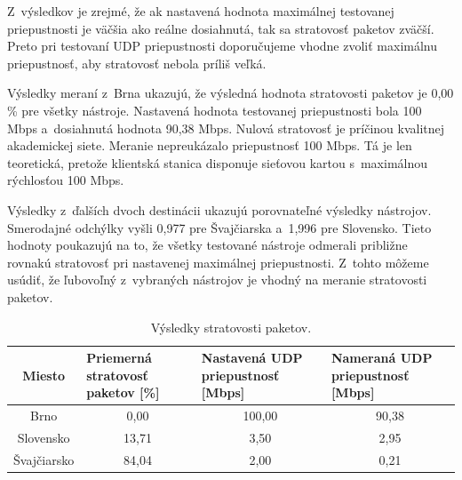         Z~výsledkov je zrejmé, že ak nastavená hodnota maximálnej testovanej 
        priepustnosti je väčšia ako reálne dosiahnutá, tak sa stratovosť paketov 
        zväčší. Preto pri testovaní UDP priepustnosti doporučujeme vhodne zvoliť
        maximálnu priepustnosť, aby stratovosť nebola príliš veľká.

        Výsledky meraní z~Brna ukazujú, že výsledná hodnota stratovosti
        paketov je 0,00 \% pre všetky nástroje. Nastavená hodnota testovanej
        priepustnosti bola 100 Mbps a~dosiahnutá hodnota 90,38 Mbps. Nulová
        stratovosť je príčinou kvalitnej akademickej siete. Meranie 
        nepreukázalo priepustnosť 100 Mbps. Tá je len teoretická, pretože 
        klientská stanica disponuje sieťovou kartou s~maximálnou rýchlosťou 100
        Mbps.
        
        Výsledky z~ďalších dvoch destinácii ukazujú porovnateľné výsledky
        nástrojov. Smerodajné odchýlky vyšli 0,977 pre Švajčiarska
        a~1,996 pre Slovensko. Tieto hodnoty poukazujú na to, že všetky testované
        nástroje odmerali približne rovnakú stratovosť pri nastavenej maximálnej 
        priepustnosti.
        Z~tohto môžeme usúdiť, že ľubovoľný z~vybraných nástrojov je 
        vhodný na meranie stratovosti paketov.

        \begin{table}[h!]
            \begin{center}
                \begin{tabular}{|m{2cm}|m{}|m{}|m{}|}
                    \hline
                    \multicolumn{1}{|c|}{Miesto} & Priemerná stratovosť paketov [\%] &
                    Nastavená UDP priepustnosť [Mbps] & 
                    Nameraná UDP priepustnosť [Mbps] \\  
                    \hline
                    \multicolumn{1}{|c|}{Brno} & \multicolumn{1}{c}{0,00} & 
                        \multicolumn{1}{|c|}{100,00} & \multicolumn{1}{c|}{90,38} \\
                    \hline
                    \multicolumn{1}{|c|}{Slovensko} & \multicolumn{1}{c}{13,71} & 
                        \multicolumn{1}{|c|}{3,50} & \multicolumn{1}{c|}{2,95} \\
                    \hline
                    \multicolumn{1}{|c|}{Švajčiarsko} & \multicolumn{1}{c}{84,04} & 
                        \multicolumn{1}{|c|}{2,00} & \multicolumn{1}{c|}{0,21} \\
                    \hline
                \end{tabular}
                \caption{Výsledky stratovosti paketov.} 
                \label{vys_loss}
            \end{center}
        \end{table}

